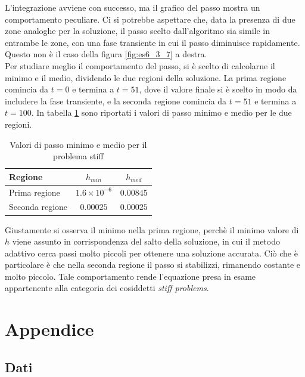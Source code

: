 \documentclass[letterpaper, 12pt]{article}
\numberwithin{equation}{section}    %
\begin{document}
L'integrazione avviene con successo, ma il grafico del passo mostra un comportamento peculiare. Ci si potrebbe
aspettare che, data la presenza di due zone analoghe per la soluzione, il passo scelto dall'algoritmo
sia simile in entrambe le zone, con una fase transiente in cui il passo diminuisce rapidamente.
Questo non è il caso della figura \ref{fig:es6_3_7} a destra.\\
Per studiare meglio il comportamento del passo, si è scelto di calcolarne il minimo e il medio, 
dividendo le due regioni della soluzione. La prima regione comincia da $t=0$ e termina a $t=51$, dove
il valore finale si è scelto in modo da includere la fase transiente, e la seconda regione comincia da $t=51$ 
e termina a $t=100$.
In tabella \ref{tab:passi_stiff} sono riportati i valori di passo minimo e medio per le due regioni. \\
\begin{table}[!ht]
    \centering
    \caption{Valori di passo minimo e medio per il problema stiff}
    \label{tab:passi_stiff}
    \begin{tabular}{|l|c|c|}
        \hline
        \textbf{Regione} & \textbf{$h_{min}$} & \textbf{$h_{med}$} \\
        \hline
        Prima regione & $1.6 \times 10^{-6}$ & $0.00845$ \\
        Seconda regione & $0.00025$ & $ 0.00025$ \\
        \hline
    \end{tabular}
\end{table}
Giustamente si osserva il minimo nella prima regione, perchè il minimo valore di $h$ viene assunto in 
corrispondenza del salto della soluzione, in cui il metodo adattivo cerca passi molto piccoli per 
ottenere una soluzione accurata. Ciò che è particolare è che nella seconda regione il passo si stabilizzi, 
rimanendo costante e molto piccolo. Tale comportamento rende l'equazione presa in esame appartenente alla 
categoria dei cosiddetti \textit{stiff problems}. 

\section{Appendice}
\subsection{Dati}
\end{document}
